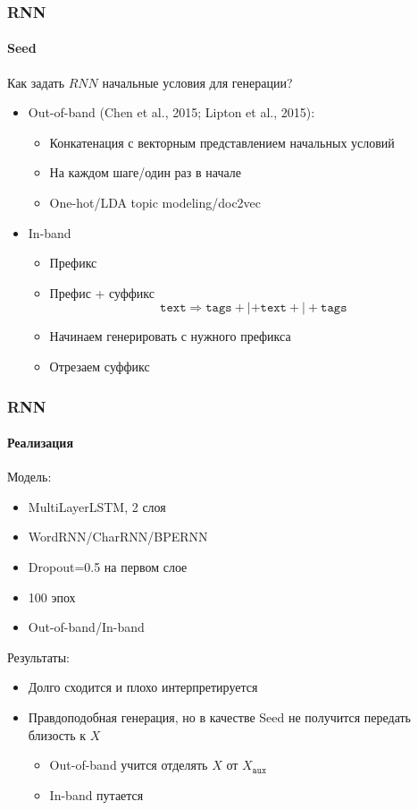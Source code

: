 \documentclass[10pt]{beamer}
\newcommand{\X}[1]{X_{\texttt{#1}}}
\newcommand{\Xaux}{\X{aux}}
\begin{document}
\begin{frame}
\frametitle{RNN}
\framesubtitle{Seed}

Как задать $RNN$ начальные условия для генерации?
\begin{itemize}
    \item Out-of-band (Chen et al., 2015; Lipton et al., 2015):
    \begin{itemize}
        \item Конкатенация с векторным представлением начальных условий
        \item На каждом шаге/один раз в начале
        \item One-hot/LDA topic modeling/doc2vec
    \end{itemize}
    \item In-band
    \begin{itemize}
        \item Префикс
        \item Префис + суффикс
        $$\texttt{text} \Rightarrow \texttt{tags} + | + \texttt{text} + | + \texttt{tags}$$
        \item Начинаем генерировать с нужного префикса
        \item Отрезаем суффикс
    \end{itemize}
\end{itemize}

\end{frame}
\begin{frame}
\frametitle{RNN}
\framesubtitle{Реализация}

Модель:
\begin{itemize}
    \item MultiLayerLSTM, 2 слоя
    \item WordRNN/CharRNN/BPERNN
    \item Dropout=0.5 на первом слое
    \item 100 эпох
    \item Out-of-band/In-band
\end{itemize}

\vskip3mm

Результаты:
\begin{itemize}
    \item Долго сходится и плохо интерпретируется
    \item Правдоподобная генерация, но в качестве Seed не получится передать близость к $X$
    \begin{itemize}
        \item Out-of-band учится отделять $X$ от $\Xaux$
        \item In-band путается
    \end{itemize}
\end{itemize}

\end{frame}
\end{document}
